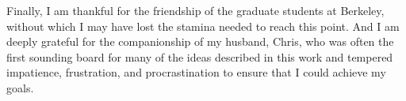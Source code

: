 \documentclass{ucbthesis}
\begin{document}
\begin{frontmatter}
\begin{acknowledgements}
Finally, I am thankful for the friendship of the graduate students at Berkeley, without which I may have lost the stamina needed to reach this point. And I am deeply grateful for the companionship of my husband, Chris, who was often the first sounding board for many of the ideas described in this work and tempered impatience, frustration, and procrastination to ensure that I could achieve my goals.

\end{acknowledgements}

\end{frontmatter}

\pagestyle{headings}















\clearpage

\printbibliography


\end{document}
